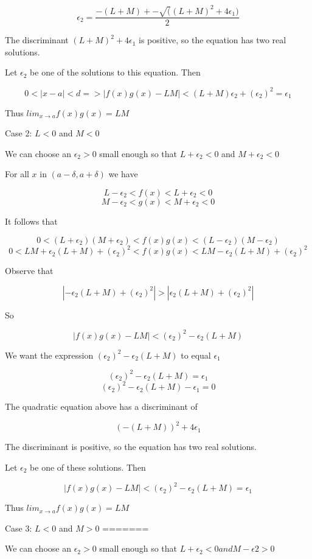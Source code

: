     $$ \epsilon_2 = \frac{-(L + M) +- \sqrt((L + M)^2 + 4\epsilon_1)}{2} $$

The discriminant $(L + M)^2 + 4\epsilon_1$ is positive, so the equation has two real solutions.

Let $\epsilon_2$ be one of the solutions to this equation. Then

    $$ 0 < |x - a| < d => |f(x)g(x) - LM| < (L + M)\epsilon_2 + (\epsilon_2)^2 = \epsilon_1 $$

Thus $lim_{x \rightarrow a} f(x)g(x) = LM$

Case 2: $L < 0$ and $M < 0$

We can choose an $\epsilon_2 > 0$ small enough so that $L + \epsilon_2 < 0$ and $M + \epsilon_2 < 0$

For all $x$ in $(a - \delta, a + \delta)$ we have

    $$ L - \epsilon_2 < f(x) < L + \epsilon_2 < 0 $$ 
    $$ M - \epsilon_2 < g(x) < M + \epsilon_2 < 0 $$
 
It follows that

    $$ 0 < (L + \epsilon_2)(M + \epsilon_2) < f(x)g(x) < (L - \epsilon_2)(M - \epsilon_2) $$
    $$ 0 < LM + \epsilon_2(L + M) + (\epsilon_2)^2 < f(x)g(x) < LM - \epsilon_2(L + M) + (\epsilon_2)^2 $$

Observe that

    $$ |-\epsilon_2(L + M) + (\epsilon_2)^2| > |\epsilon_2(L + M) + (\epsilon_2)^2| $$

So

    $$ |f(x)g(x) - LM| < (\epsilon_2)^2 - \epsilon_2(L + M) $$

We want the expression $(\epsilon_2)^2 - \epsilon_2(L + M)$ to equal $\epsilon_1$

    $$ (\epsilon_2)^2 - \epsilon_2(L + M) = \epsilon_1 $$
    $$ (\epsilon_2)^2 - \epsilon_2(L + M) - \epsilon_1 = 0 $$

The quadratic equation above has a discriminant of

    $$ (-(L + M))^2 + 4\epsilon_1 $$

The discriminant is positive, so the equation has two real solutions.

Let $\epsilon_2$ be one of these solutions. Then

    $$ |f(x)g(x) - LM| < (\epsilon_2)^2 - \epsilon_2(L + M) = \epsilon_1 $$

Thus $lim_{x \rightarrow a} f(x)g(x) = LM$

Case 3: $L < 0$ and $M > 0$
=======

We can choose an $\epsilon_2 > 0$ small enough so that $L + \epsilon_2 < 0 and M - \epsilon2 > 0$

